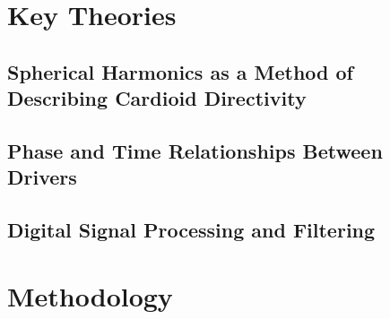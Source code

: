 \documentclass{report}
\begin{document}
    







\chapter{Key Theories}
    \section{Spherical Harmonics as a Method of Describing Cardioid Directivity}
    \section{Phase and Time Relationships Between Drivers}
    \section{Digital Signal Processing and Filtering}



\chapter{Methodology}
\end{document}
